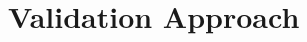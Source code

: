 \documentclass[../main.tex]{subfiles}
\begin{document}
\section{Validation Approach}\label{sec:validation}
\end{document}
